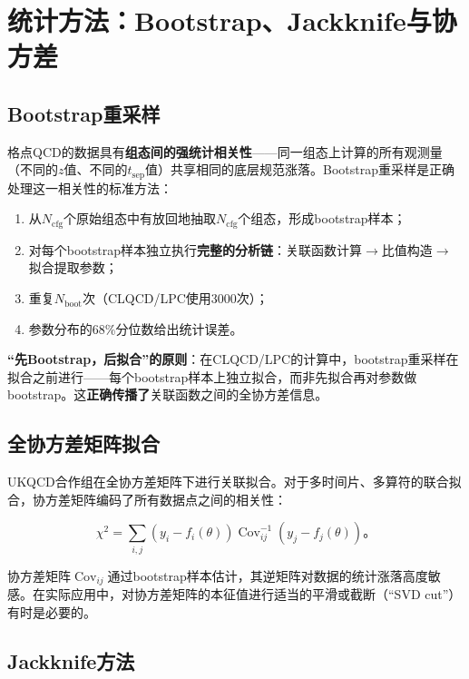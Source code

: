 \documentclass[12pt,a4paper]{ctexart}
\theoremstyle{definition}
\begin{document}
\section{统计方法：Bootstrap、Jackknife与协方差}

\subsection{Bootstrap重采样}

格点QCD的数据具有\textbf{组态间的强统计相关性}——同一组态上计算的所有观测量（不同的$z$值、不同的$t_{\text{sep}}$值）共享相同的底层规范涨落。Bootstrap重采样是正确处理这一相关性的标准方法\cite{Chen2025gluon,UKQCD1993}：

\begin{enumerate}
    \item 从$N_{\text{cfg}}$个原始组态中有放回地抽取$N_{\text{cfg}}$个组态，形成bootstrap样本；
    \item 对每个bootstrap样本独立执行\textbf{完整的分析链}：关联函数计算$\to$比值构造$\to$拟合提取参数；
    \item 重复$N_{\text{boot}}$次（CLQCD/LPC使用3000次\cite{Chen2025gluon}）；
    \item 参数分布的68\%分位数给出统计误差。
\end{enumerate}

\textbf{``先Bootstrap，后拟合''的原则}：在CLQCD/LPC的计算中\cite{Chen2025gluon}，bootstrap重采样在拟合之前进行——每个bootstrap样本上独立拟合，而非先拟合再对参数做bootstrap。这\textbf{正确传播了}关联函数之间的全协方差信息。

\subsection{全协方差矩阵拟合}

UKQCD合作组\cite{UKQCD1993}在全协方差矩阵下进行关联拟合。对于多时间片、多算符的联合拟合，协方差矩阵编码了所有数据点之间的相关性：

\begin{equation}
\chi^2 = \sum_{i,j} (y_i - f_i(\theta)) \operatorname{Cov}^{-1}_{ij} (y_j - f_j(\theta))。
\label{eq:chisq_cov}
\end{equation}

协方差矩阵$\operatorname{Cov}_{ij}$通过bootstrap样本估计，其逆矩阵对数据的统计涨落高度敏感。在实际应用中，对协方差矩阵的本征值进行适当的平滑或截断（``SVD cut''）有时是必要的。

\subsection{Jackknife方法}
\end{document}
